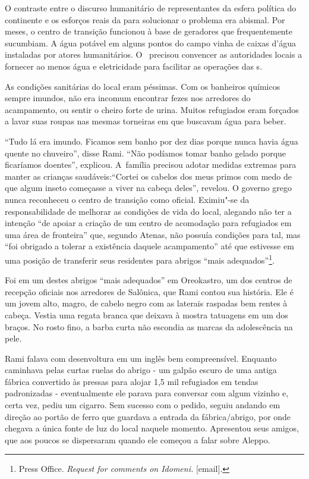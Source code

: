 O contraste entre o discurso humanitário de representantes da esfera
política do continente e os esforços reais da  para solucionar o
problema era abismal. Por meses, o centro de transição funcionou à base
de geradores que frequentemente sucumbiam. A água potável em alguns
pontos do campo vinha de caixas d'água instaladas por atores
humanitários. O~ precisou convencer as autoridades locais a fornecer
ao menos água e eletricidade para facilitar as operações das s.

As condições sanitárias do local eram péssimas. Com os banheiros
químicos sempre imundos, não era incomum encontrar fezes nos arredores
do acampamento, ou sentir o cheiro forte de urina. Muitos refugiados
eram forçados a lavar suas roupas nas mesmas torneiras em que
buscavam água para beber.

``Tudo lá era imundo. Ficamos sem banho por dez dias porque nunca havia
água quente no chuveiro'', disse Rami. ``Não podíamos tomar banho gelado
porque ficaríamos doentes'', explicou. A~família precisou adotar
medidas extremas para manter as crianças saudáveis:``Cortei os cabelos
dos meus primos com medo de que algum inseto começasse a viver na cabeça
deles'', revelou.
% 
% 
% 
O governo grego nunca reconheceu o centro de transição como oficial.
Eximiu"-se da responsabilidade de melhorar as condições de vida do local,
alegando não ter a intenção ``de apoiar a criação de um centro de
acomodação para refugiados em uma área de fronteira'' que, segundo
Atenas, não possuía condições para tal, mas ``foi obrigado a tolerar a
existência daquele acampamento'' até que estivesse em uma posição de
transferir seus residentes para abrigos ``mais
adequados''\footnote{ Press Office. \emph{Request for comments on
Idomeni}\emph{.} {[}email{]}.}.

Foi em um destes abrigos ``mais adequados'' em Oreokastro, um dos
centros de recepção oficiais nos arredores de Salônica, que Rami contou
sua história. Ele é um jovem alto, magro, de cabelo negro com as
laterais raspadas bem rentes à cabeça. Vestia uma regata branca
que deixava à mostra tatuagens em um dos braços. No rosto fino, a barba
curta não escondia as marcas da adolescência na pele.

Rami falava com desenvoltura em um inglês bem compreensível. Enquanto
caminhava pelas curtas ruelas do abrigo - um galpão escuro de uma antiga
fábrica convertido às pressas para alojar 1,5 mil refugiados em tendas
padronizadas - eventualmente ele parava para conversar com algum vizinho e, certa vez, pediu um cigarro.
Sem sucesso com o pedido, seguiu andando em direção ao
portão de ferro que guardava a entrada da fábrica/abrigo, por onde
chegava a única fonte de luz do local naquele momento. Apresentou seus
amigos, que aos poucos se dispersaram quando ele começou a falar sobre
Aleppo.


